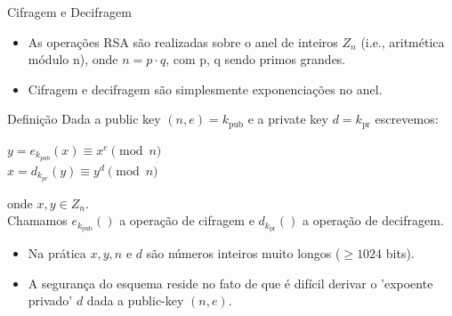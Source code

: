 \documentclass{beamer}
\begin{document}
\begin{frame}{Cifragem e Decifragem}
    \begin{itemize}
        \item As operações RSA são realizadas sobre o anel de inteiros $Z_n$ (i.e., aritmética módulo n), onde $n = p \cdot q$, com p, q sendo primos grandes.
        \item Cifragem e decifragem são simplesmente exponenciações no anel.
    \end{itemize}

    \begin{block}{Definição}
        Dada a public key $(n,e) = k_{\text{pub}}$ e a private key $d = k_{\text{pr}}$ escrevemos:
        \vspace{-0.3em}
        \begin{center}
            $y = e_{k_{pub}}(x) \equiv x^e \pmod{n}$ \\
            $x = d_{k_{pr}}(y) \equiv y^d \pmod{n}$
        \end{center}
        \vspace{-0.3em}
        onde $x, y \in Z_n$. \\
        Chamamos $e_{k_{\text{pub}}}()$ a operação de cifragem e $d_{k_{\text{pr}}}()$ a operação de decifragem.
    \end{block}

    \begin{itemize}
        \item Na prática $x, y, n$ e $d$ são números inteiros muito longos ($\ge 1024$ bits).
        \item A segurança do esquema reside no fato de que é difícil derivar o 'expoente privado' $d$ dada a public-key $(n, e)$.
    \end{itemize}
\end{frame}
\end{document}
